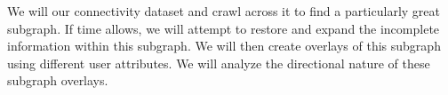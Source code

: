We will our connectivity dataset and crawl across it to find a particularly great subgraph.  If time allows, we will attempt to restore and expand the incomplete information within this subgraph.  We will then create overlays of this subgraph using different user attributes.  We will analyze the directional nature of these subgraph overlays.